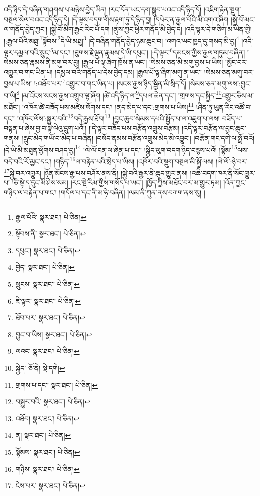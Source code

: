 འདི་ཉིད་དེ་བཞིན་གཤགས་པ་མཉེས་བྱེད་ཡིན། །རང་དོན་ཡང་དག་སྒྲུབ་པའང་འདི་ཉིད་དོ། །འཇིག་རྟེན་སྡུག་བསྔལ་སེལ་བའང་འདི་ཉིད་དེ། །དེ་ལྟས་བདག་གིས་རྟག་ཏུ་དེ་ཉིད་བྱ། །དཔེར་ན་རྒྱལ་པོའི་མི་འགའ་ཞིག །སྐྱེ་བོ་མང་ལ་གནོད་བྱེད་ཀྱང་། །སྐྱེ་བོ་མིག་རྒྱང་རིང་པོ་དག །ནུས་ཀྱང་ཕྱིར་གནོད་མི་བྱེད་དེ། །འདི་ལྟར་དེ་གཅིག་མ་ཡིན་གྱི། །:རྒྱལ་པོའི་མཐུ་\footnote{རྒྱལ་པོའི་  སྣར་ཐང་།  པེ་ཅིན། }སྟོབས་\footnote{སྟོབས་ནི་  སྣར་ཐང་།  པེ་ཅིན། }དེ་ཡི་མཐུ།\footnote{དཔུང་།  སྣར་ཐང་།  པེ་ཅིན། } །དེ་བཞིན་གནོད་བྱེད་ཉམ་ཆུང་བ། །འགའ་ཡང་ཁྱད་དུ་གསད་མི་བྱ།\footnote{བྱེད།  སྣར་ཐང་།  པེ་ཅིན། } །འདི་ལྟར་དམྱལ་བའི་སྲུང་\footnote{སྲུངས་  སྣར་ཐང་།  པེ་ཅིན། }མ་དང་། །ཐུགས་རྗེ་ལྡན་རྣམས་དེ་ཡི་དཔུང་། །:དེ་ལྟར་\footnote{ཇི་ལྟར་  སྣར་ཐང་།  པེ་ཅིན། }དམངས་ཀྱིས་རྒྱལ་གཏུམ་བཞིན། །སེམས་ཅན་རྣམས་ནི་མགུ་བར་བྱ། །རྒྱལ་པོ་ལྟ་ཞིག་ཁྲོས་ན་ཡང་། །སེམས་ཅན་མི་མགུ་བྱས་པ་ཡིས། །མྱོང་བར་འགྱུར་བ་གང་ཡིན་པ། །དམྱལ་བའི་གནོད་པ་དེས་བྱེད་དམ། །རྒྱལ་པོ་ལྟ་ཞིག་མགུ་ན་ཡང་། །སེམས་ཅན་མགུ་བར་བྱས་པ་ཡིས། །:འཐོབ་པར་\footnote{ཐོབ་པར་  སྣར་ཐང་།  པེ་ཅིན། }འགྱུར་བ་གང་ཡིན་པ། །སངས་རྒྱས་ཉིད་སྦྱིན་མི་སྲིད་དོ། །སེམས་ཅན་མགུ་ལས་:བྱུང་བ་ཡི།\footnote{བྱུང་བ་ཡིས།  སྣར་ཐང་།  པེ་ཅིན། } །མ་འོངས་སངས་རྒྱས་འགྲུབ་ལྟ་ཞོག །ཚེ་འདི་ཉིད་ལ་\footnote{ལའང་  སྣར་ཐང་།  པེ་ཅིན། }དཔལ་ཆེན་དང་། །གྲགས་དང་སྐྱིད་\footnote{སྐྱེད་  ཅོ་ནེ།  སྡེ་དགེ། }འགྱུར་ཅིས་མ་མཐོང་། །འཁོར་ཚེ་བཟོད་པས་མཛེས་སོགས་དང་། །ནད་མེད་པ་དང་:གྲགས་པ་ཡིས།\footnote{གྲགས་པ་དང་།  སྣར་ཐང་།  པེ་ཅིན། } །ཤིན་ཏུ་ཡུན་རིང་འཚོ་བ་དང་། །འཁོར་ལོས་:སྒྱུར་བའི་\footnote{བསྒྱུར་བའི་  སྣར་ཐང་།  པེ་ཅིན། }བདེ་རྒྱས་ཐོབ།\footnote{འཐོབ།  སྣར་ཐང་།  པེ་ཅིན། } །བྱང་ཆུབ་སེམས་དཔའི་སྤྱོད་པ་ལ་འཇུག་པ་ལས། བཟོད་པ་བསྟན་པ་ཞེས་བྱ་བ་སྟེ་ལེའུ་དྲུག་པའོ།། །།དེ་ལྟར་བཟོད་པས་བརྩོན་འགྲུས་བརྩམ། །འདི་ལྟར་བརྩོན་ལ་བྱང་ཆུབ་གནས། །རླུང་མེད་གཡོ་བ་མེད་པ་བཞིན། །བསོད་ནམས་བརྩོན་འགྲུས་མེད་མི་འབྱུང་། །བརྩོན་གང་དགེ་ལ་སྤྲོ་བའོ། །དེ་ཡི་མི་མཐུན་ཕྱོགས་བཤད་བྱ།\footnote{ན།  སྣར་ཐང་།  པེ་ཅིན། } །ལེ་ལོ་ངན་ལ་ཞེན་པ་དང་། །སྒྱིད་ལུག་བདག་ཉིད་བརྙས་པའོ། །སྙོམ་\footnote{སྙོམས་  སྣར་ཐང་།  པེ་ཅིན། }ལས་བདེ་བའི་རོ་མྱང་དང་། །གཉིད་\footnote{གཉིས་  སྣར་ཐང་།  པེ་ཅིན། }ལ་བརྟེན་པའི་སྲེད་པ་ཡིས། །འཁོར་བའི་སྡུག་བསྔལ་མི་སྐྱོ་ལས། །ལེ་ལོ་:ཉེ་བར་\footnote{ངེས་པར་  སྣར་ཐང་།  པེ་ཅིན། }སྐྱེ་བར་འགྱུར། །ཉོན་མོངས་རྒྱ་པས་བཤོར་ནས་ནི། །སྐྱེ་བའི་རྒྱར་ནི་ཆུད་གྱུར་ནས། །འཆི་བདག་ཁར་ནི་སོང་གྱུར་པ། །ཅི་སྟེ་ད་དུང་མི་ཤེས་སམ། །རང་སྡེ་རིམ་གྱིས་གསོད་པ་ཡང་། །ཁྱོད་ཀྱིས་མཐོང་བར་མ་གྱུར་ཏམ། །འོན་ཀྱང་གཉིད་ལ་བརྟེན་པ་གང་། །གདོལ་པ་དང་ནི་མ་ཧེ་བཞིན། །ལམ་ནི་ཀུན་ནས་བཀག་ནས་སུ། །
